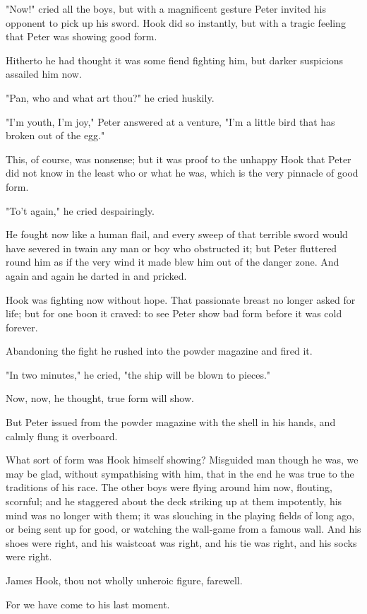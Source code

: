 "Now!" cried all the boys, but with a magnificent gesture Peter invited
his opponent to pick up his sword. Hook did so instantly, but with a
tragic feeling that Peter was showing good form.


Hitherto he had thought it was some fiend fighting him, but darker
suspicions assailed him now.


"Pan, who and what art thou?" he cried huskily.


"I'm youth, I'm joy," Peter answered at a venture, "I'm a little bird that
has broken out of the egg."


This, of course, was nonsense; but it was proof to the unhappy Hook that
Peter did not know in the least who or what he was, which is the very
pinnacle of good form.


"To't again," he cried despairingly.


He fought now like a human flail, and every sweep of that terrible sword
would have severed in twain any man or boy who obstructed it; but Peter
fluttered round him as if the very wind it made blew him out of the danger
zone. And again and again he darted in and pricked.


Hook was fighting now without hope. That passionate breast no longer asked
for life; but for one boon it craved: to see Peter show bad form before it
was cold forever.


Abandoning the fight he rushed into the powder magazine and fired it.


"In two minutes," he cried, "the ship will be blown to pieces."


Now, now, he thought, true form will show.


But Peter issued from the powder magazine with the shell in his hands, and
calmly flung it overboard.


What sort of form was Hook himself showing? Misguided man though he was,
we may be glad, without sympathising with him, that in the end he was true
to the traditions of his race. The other boys were flying around him now,
flouting, scornful; and he staggered about the deck striking up at them
impotently, his mind was no longer with them; it was slouching in the
playing fields of long ago, or being sent up for good,
or watching the wall-game from a famous wall. And his shoes were right,
and his waistcoat was right, and his tie was right, and his socks were
right.


James Hook, thou not wholly unheroic figure, farewell.


For we have come to his last moment.



